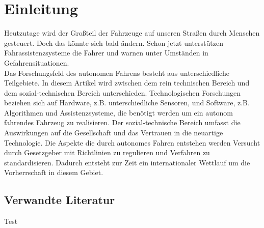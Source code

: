 \section{Einleitung}

Heutzutage wird der Großteil der Fahrzeuge auf unseren Straßen durch Menschen gesteuert. Doch das könnte sich bald ändern. Schon jetzt unterstützen Fahrassistenzsysteme die Fahrer und warnen unter Umständen in Gefahrensituationen.\\

Das Forschungsfeld des autonomen Fahrens besteht aus unterschiedliche Teilgebiete. In diesem Artikel wird  zwischen dem rein technischen Bereich und dem sozial-technischen Bereich unterschieden. Technologischen Forschungen beziehen sich auf Hardware, z.B. unterschiedliche Sensoren, und Software, z.B. Algorithmen und Assistenzsysteme, die benötigt werden um ein autonom fahrendes Fahrzeug zu realisieren. Der sozial-technische Bereich umfasst die Auswirkungen auf die Gesellschaft und das Vertrauen in die neuartige Technologie. Die Aspekte die durch autonomes Fahren entstehen werden Versucht durch Gesetzgeber mit Richtlinien zu regulieren und Verfahren zu standardisieren. Dadurch entsteht zur Zeit ein internationaler Wettlauf um die Vorherrschaft in diesem Gebiet.\\

\subsection{Verwandte Literatur}

Test